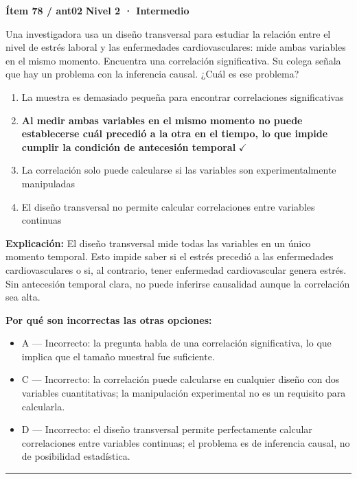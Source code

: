 \documentclass[12pt,a4paper]{article}
\begin{document}
\begin{mdframed}[backgroundcolor=fondogris,linecolor=ambar,linewidth=1pt,innerleftmargin=10pt,innerrightmargin=10pt,innertopmargin=7pt,innerbottommargin=7pt]
\textbf{Ítem 78 / ant02} \hfill {\small\bfseries\color{ambar} Nivel 2 · Intermedio}
\end{mdframed}

Una investigadora usa un diseño transversal para estudiar la relación entre el nivel de estrés laboral y las enfermedades cardiovasculares: mide ambas variables en el mismo momento. Encuentra una correlación significativa. Su colega señala que hay un problema con la inferencia causal. ¿Cuál es ese problema?

\begin{enumerate}
  \item[A.] La muestra es demasiado pequeña para encontrar correlaciones significativas
  \item[\textbf{\color{verde}B.}] \textbf{\color{verde} Al medir ambas variables en el mismo momento no puede establecerse cuál precedió a la otra en el tiempo, lo que impide cumplir la condición de antecesión temporal} \hfill $\checkmark$
  \item[C.] La correlación solo puede calcularse si las variables son experimentalmente manipuladas
  \item[D.] El diseño transversal no permite calcular correlaciones entre variables continuas
\end{enumerate}

\noindent\textbf{\color{azul}Explicación:} El diseño transversal mide todas las variables en un único momento temporal. Esto impide saber si el estrés precedió a las enfermedades cardiovasculares o si, al contrario, tener enfermedad cardiovascular genera estrés. Sin antecesión temporal clara, no puede inferirse causalidad aunque la correlación sea alta.

\noindent\textbf{\color{gris}Por qué son incorrectas las otras opciones:}
\begin{itemize}
  \item {\small A — Incorrecto: la pregunta habla de una correlación significativa, lo que implica que el tamaño muestral fue suficiente.}
  \item {\small C — Incorrecto: la correlación puede calcularse en cualquier diseño con dos variables cuantitativas; la manipulación experimental no es un requisito para calcularla.}
  \item {\small D — Incorrecto: el diseño transversal permite perfectamente calcular correlaciones entre variables continuas; el problema es de inferencia causal, no de posibilidad estadística.}
\end{itemize}
\vspace{8pt}\hrule\vspace{10pt}
\end{document}
